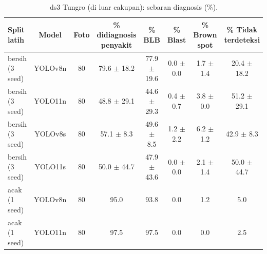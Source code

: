 \begin{table}[!t]
\centering
\caption{ds3 Tungro (di luar cakupan): sebaran diagnosis (\%).}
\label{tab:ds3_tungro}
\footnotesize
\begin{tabular}{lccccccc}
\hline
\textbf{Split latih} & \textbf{Model} & \textbf{Foto} & \textbf{\% didiagnosis penyakit} & \textbf{\% BLB} & \textbf{\% Blast} & \textbf{\% Brown spot} & \textbf{\% Tidak terdeteksi} \\
\hline
bersih (3 seed) & YOLOv8n & 80 & 79.6 $\pm$ 18.2 & 77.9 $\pm$ 19.6 & 0.0 $\pm$ 0.0 & 1.7 $\pm$ 1.4 & 20.4 $\pm$ 18.2 \\
bersih (3 seed) & YOLO11n & 80 & 48.8 $\pm$ 29.1 & 44.6 $\pm$ 29.3 & 0.4 $\pm$ 0.7 & 3.8 $\pm$ 0.0 & 51.2 $\pm$ 29.1 \\
bersih (3 seed) & YOLOv8s & 80 & 57.1 $\pm$ 8.3 & 49.6 $\pm$ 8.5 & 1.2 $\pm$ 2.2 & 6.2 $\pm$ 1.2 & 42.9 $\pm$ 8.3 \\
bersih (3 seed) & YOLO11s & 80 & 50.0 $\pm$ 44.7 & 47.9 $\pm$ 43.6 & 0.0 $\pm$ 0.0 & 2.1 $\pm$ 1.4 & 50.0 $\pm$ 44.7 \\
acak (1 seed) & YOLOv8n & 80 & 95.0 & 93.8 & 0.0 & 1.2 & 5.0 \\
acak (1 seed) & YOLO11n & 80 & 97.5 & 97.5 & 0.0 & 0.0 & 2.5 \\
\hline
\end{tabular}
\end{table}
